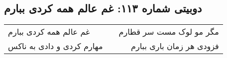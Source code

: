 \begin{center}
\section*{دوبیتی شماره ۱۱۳: غم عالم همه کردی ببارم}
\label{sec:113}
\begin{longtable}{l p{0.5cm} r}
غم عالم همه کردی ببارم
&&
مگر مو لوک مست سر قطارم
\\
مهارم کردی و دادی به ناکس
&&
فزودی هر زمان باری ببارم
\\
\end{longtable}
\end{center}
